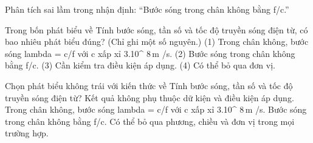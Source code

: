 \begin{bt}
Phân tích sai lầm trong nhận định: “Bước sóng trong chân không bằng f/c.”
\end{bt}

\begin{ex}
Trong bốn phát biểu về Tính bước sóng, tần số và tốc độ truyền sóng điện từ, có bao nhiêu phát biểu đúng? (Chỉ ghi một số nguyên.) (1) Trong chân không, bước sóng lambda = c/f với c xấp xỉ 3.10^ $8\,\text{m}$ /s. (2) Bước sóng trong chân không bằng f/c. (3) Cần kiểm tra điều kiện áp dụng. (4) Có thể bỏ qua đơn vị.
\end{ex}

\begin{ex}
Chọn phát biểu không trái với kiến thức về Tính bước sóng, tần số và tốc độ truyền sóng điện từ?
\choice
{Kết quả không phụ thuộc dữ kiện và điều kiện áp dụng.}
{\True Trong chân không, bước sóng lambda = c/f với c xấp xỉ 3.10^ $8\,\text{m}$ /s.}
{Bước sóng trong chân không bằng f/c.}
{Có thể bỏ qua phương, chiều và đơn vị trong mọi trường hợp.}
\end{ex}

